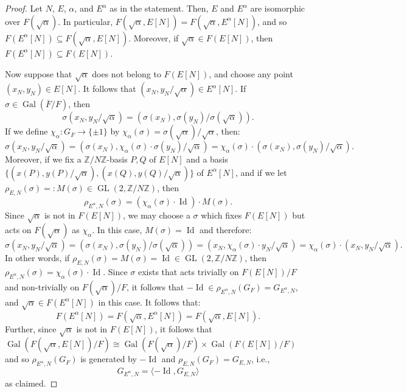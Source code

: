 \documentclass[11pt]{amsart}
\theoremstyle{definition}
\newcommand{\Z}{\mathbb Z}
\newcommand{\Gal}{\operatorname{Gal}}
\newcommand{\GL}{\operatorname{GL}}
\begin{document}
\begin{proof}
    Let $N$, $E$, $\alpha$, and $E^\alpha$ as in the statement. Then, $E$ and $E^\alpha$ are isomorphic over $F(\sqrt{\alpha})$. In particular, $F(\sqrt{\alpha},E[N]) = F(\sqrt{\alpha}, E^\alpha[N])$, and so $F(E^\alpha[N])\subseteq F(\sqrt{\alpha},E[N])$. Moreover, if $\sqrt{\alpha}\in F(E[N])$, then $F(E^\alpha[N])\subseteq F(E[N]).$

    Now suppose that $\sqrt{\alpha}$ does not belong to $F(E[N])$, and choose any point $(x_N,y_N)\in E[N]$. It follows that $(x_N,y_N/\sqrt{\alpha})\in E^\alpha[N]$. If $\sigma \in \Gal(\overline{F}/F)$, then 
    $$\sigma (x_N,y_N/\sqrt{\alpha}) = (\sigma(x_N), \sigma(y_N)/\sigma(\sqrt{\alpha})).$$
    If we define $\chi_\alpha\colon G_F \to \{\pm 1\}$ by $\chi_\alpha(\sigma)=\sigma(\sqrt{\alpha})/\sqrt{\alpha}$, then:
    $$\sigma (x_N,y_N/\sqrt{\alpha}) = (\sigma(x_N), \chi_{\alpha}(\sigma)\cdot \sigma(y_N)/\sqrt{\alpha})=\chi_{\alpha}(\sigma)\cdot (\sigma(x_N),\sigma (y_N)/\sqrt{\alpha}).$$
Moreover, if we fix a $\Z/N\Z$-basis ${P,Q}$ of $E[N]$ and a basis $\{(x(P),y(P)/\sqrt{\alpha}),(x(Q),y(Q)/\sqrt{\alpha}) \}$ of $E^\alpha[N]$, and if we let $\rho_{E,N}(\sigma) =: M(\sigma)\in \GL(2,\Z/N\Z)$, then
$$\rho_{E^\alpha,N}(\sigma) = (\chi_{\alpha}(\sigma)\cdot \operatorname{Id})\cdot M(\sigma).$$
Since $\sqrt{\alpha}$ is not in $F(E[N])$, we may choose a $\sigma$ which fixes $F(E[N])$ but acts on $F(\sqrt{\alpha})$ as $\chi_\alpha$. In this case, $M(\sigma)=\operatorname{Id}$ and therefore:
    $$\sigma (x_N,y_N/\sqrt{\alpha}) = (\sigma(x_N), \sigma(y_N)/\sigma(\sqrt{\alpha})) = (x_N,\chi_{\alpha}(\sigma)\cdot y_N/\sqrt{\alpha})=\chi_{\alpha}(\sigma)\cdot  (x_N,y_N/\sqrt{\alpha}).$$
    In other words, if $\rho_{E,N}(\sigma) = M(\sigma)=\operatorname{Id}\in \GL(2,\Z/N\Z)$, then 
$\rho_{E^\alpha,N}(\sigma) = \chi_{\alpha}(\sigma)\cdot \operatorname{Id}.$ Since $\sigma$ exists that acts trivially  on $F(E[N])/F$ and non-trivially on $F(\sqrt{\alpha})/F$, it follows that $-\operatorname{Id}\in \rho_{E^\alpha,N}(G_F)=G_{E^\alpha,N}$, and $\sqrt{\alpha}\in F(E^\alpha[N])$ in this case. It follows that:
$$F(E^\alpha[N]) = F(\sqrt{\alpha},E^\alpha[N])=F(\sqrt{\alpha},E[N]).$$
Further, since $\sqrt{\alpha}$ is not in $F(E[N])$, it follows that $\Gal(F(\sqrt{\alpha},E[N])/F)\cong \Gal(F(\sqrt{\alpha})/F)\times \Gal(F(E[N])/F)$ and so $\rho_{E^\alpha,N}(G_F)$ is generated by $-\operatorname{Id}$ and $\rho_{E,N}(G_F)=G_{E,N}$, i.e., 
$$G_{E^\alpha,N} = \langle -\operatorname{Id}, G_{E,N} \rangle$$
as claimed.
\end{proof}
\end{document}
